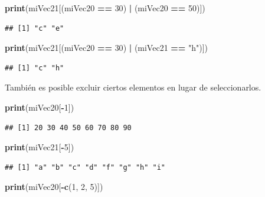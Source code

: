 \documentclass[
]{book}
\newenvironment{Shaded}{\begin{snugshade}}{\end{snugshade}}
\newcommand{\DecValTok}[1]{\textcolor[rgb]{0.00,0.00,0.81}{#1}}
\newcommand{\KeywordTok}[1]{\textcolor[rgb]{0.13,0.29,0.53}{\textbf{#1}}}
\newcommand{\NormalTok}[1]{#1}
\newcommand{\OperatorTok}[1]{\textcolor[rgb]{0.81,0.36,0.00}{\textbf{#1}}}
\newcommand{\StringTok}[1]{\textcolor[rgb]{0.31,0.60,0.02}{#1}}
\begin{document}
\begin{Shaded}
\begin{Highlighting}[]
\KeywordTok{print}\NormalTok{(miVec21[(miVec20 }\OperatorTok{==}\StringTok{ }\DecValTok{30}\NormalTok{) }\OperatorTok{|}\StringTok{ }\NormalTok{(miVec20 }\OperatorTok{==}\StringTok{ }\DecValTok{50}\NormalTok{)])}
\end{Highlighting}
\end{Shaded}

\begin{verbatim}
## [1] "c" "e"
\end{verbatim}

\begin{Shaded}
\begin{Highlighting}[]
\KeywordTok{print}\NormalTok{(miVec21[(miVec20 }\OperatorTok{==}\StringTok{ }\DecValTok{30}\NormalTok{) }\OperatorTok{|}\StringTok{ }\NormalTok{(miVec21 }\OperatorTok{==}\StringTok{ "h"}\NormalTok{)])}
\end{Highlighting}
\end{Shaded}

\begin{verbatim}
## [1] "c" "h"
\end{verbatim}

También es posible excluir ciertos elementos en lugar de seleccionarlos.

\begin{Shaded}
\begin{Highlighting}[]
\KeywordTok{print}\NormalTok{(miVec20[}\OperatorTok{-}\DecValTok{1}\NormalTok{])}
\end{Highlighting}
\end{Shaded}

\begin{verbatim}
## [1] 20 30 40 50 60 70 80 90
\end{verbatim}

\begin{Shaded}
\begin{Highlighting}[]
\KeywordTok{print}\NormalTok{(miVec21[}\OperatorTok{-}\DecValTok{5}\NormalTok{])}
\end{Highlighting}
\end{Shaded}

\begin{verbatim}
## [1] "a" "b" "c" "d" "f" "g" "h" "i"
\end{verbatim}

\begin{Shaded}
\begin{Highlighting}[]
\KeywordTok{print}\NormalTok{(miVec20[}\OperatorTok{-}\KeywordTok{c}\NormalTok{(}\DecValTok{1}\NormalTok{, }\DecValTok{2}\NormalTok{, }\DecValTok{5}\NormalTok{)])}
\end{Highlighting}
\end{Shaded}
\end{document}
